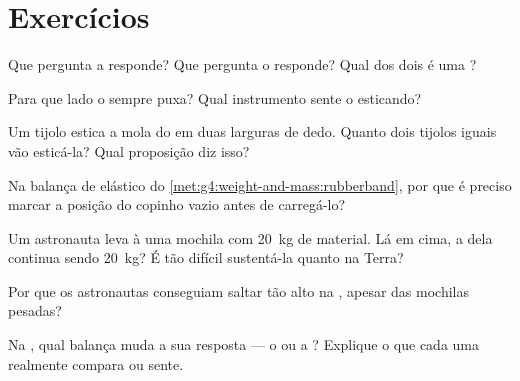 \section{Exercícios}

\begin{exercise}[$\star$]\label{exo:g4:weight-and-mass:1}
Que pergunta a  responde? Que pergunta o  responde? Qual dos
dois é uma ?
\end{exercise}

\begin{exercise}[$\star$]\label{exo:g4:weight-and-mass:2}
Para que lado o  sempre puxa? Qual instrumento sente o 
esticando?
\end{exercise}

\begin{exercise}[$\star$]\label{exo:g4:weight-and-mass:3}
Um tijolo estica a mola do  em duas larguras de dedo.
Quanto dois tijolos iguais vão esticá-la? Qual proposição diz isso?
\end{exercise}

\begin{exercise}[$\star$]\label{exo:g4:weight-and-mass:4}
Na balança de elástico do
\cref{met:g4:weight-and-mass:rubberband}, por que é preciso marcar a
posição do copinho vazio antes de carregá-lo?
\end{exercise}

\begin{exercise}[$\star$]\label{exo:g4:weight-and-mass:5}
Um astronauta leva à  uma mochila com \qty{20}{kg} de material. Lá
em cima, a  dela continua sendo \qty{20}{kg}? É tão difícil
sustentá-la quanto na Terra?
\end{exercise}

\begin{exercise}[$\star$]\label{exo:g4:weight-and-mass:6}
Por que os astronautas conseguiam saltar tão alto na , apesar das
mochilas pesadas?
\end{exercise}

\begin{exercise}[$\star$]\label{exo:g4:weight-and-mass:7}
Na , qual balança muda a sua resposta --- o  ou a
? Explique o que cada uma realmente compara ou
sente.
\end{exercise}

